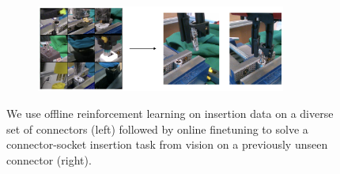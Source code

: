 \documentclass[letterpaper, 10 pt, conference, final]{ieeeconf}   %
\begin{document}
\begin{figure}[t]
    \centering
    \begin{subfigure}[b]{0.9\linewidth}
        \center
        \includegraphics[width=0.9\textwidth]{imgs/fig1.png}
    \end{subfigure}

    \caption{We use offline reinforcement learning on insertion data on a diverse set of connectors (left) followed by online finetuning to solve a connector-socket insertion task from vision on a previously unseen connector (right).}
    \label{fig:novel_obj}
    \vspace{-0.5cm}
\end{figure}

\end{document}
